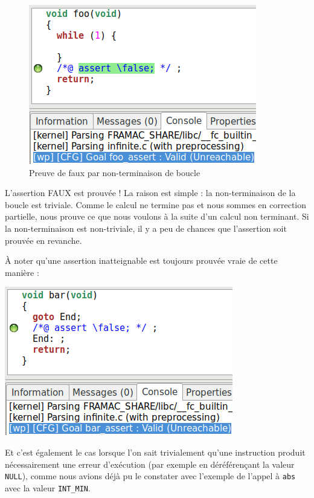\documentclass[12pt,francais,]{scrbook}
\newenvironment{zdsblock}[1]{%
  \tcolorbox[beamer,%
    noparskip,breakable,
    colback=LightBlue,colframe=DarkBlue,%
    colbacklower=DarkBlue,%
    title=#1]
}{\endtcolorbox}
\begin{document}
\begin{figure}[htbp]
\centering
\includegraphics[scale=0.5]{3-3-infinite.png}
\caption{Preuve de faux par non-terminaison de boucle}
\label{fig:3-3-infini}
\end{figure}

L'assertion \og{}FAUX\fg{} est prouvée ! La raison est simple : la
non-terminaison de la boucle est triviale. Comme le calcul ne termine
pas et nous sommes en correction partielle, nous prouve ce que nous
voulons à la suite d'un calcul non terminant. Si la non-terminaison est
non-triviale, il y a peu de chances que l'assertion soit prouvée en
revanche.

\begin{zdsblock}{Information}
  À noter qu'une assertion
  inatteignable est toujours prouvée vraie de cette manière :
  \begin{center}
  \includegraphics[scale=0.5]{3-3-goto_end.png}
  \end{center}
  
  Et c'est également le cas lorsque l'on sait
  trivialement qu'une instruction produit nécessairement une
  erreur d'exécution (par exemple en déréférençant la valeur
  \texttt{NULL}), comme nous avions déjà pu le constater avec l'exemple
  de l'appel à \texttt{abs} avec la valeur \texttt{INT\_MIN}.
\end{zdsblock}
\end{document}
